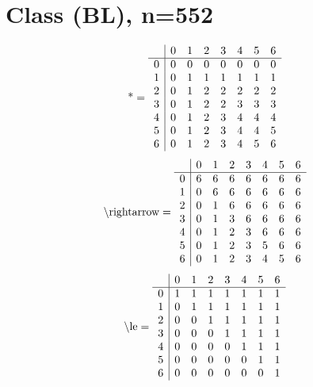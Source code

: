 \documentclass[11pt]{article}
\begin{document}
\section{Class (BL), n=552}
\[\text{*} = 
\begin{array}{r | r r r r r r r}
 & 0 & 1 & 2 & 3 & 4 & 5 & 6 \\ \hline
0 & 0 & 0 & 0 & 0 & 0 & 0 & 0 \\
1 & 0 & 1 & 1 & 1 & 1 & 1 & 1 \\
2 & 0 & 1 & 2 & 2 & 2 & 2 & 2 \\
3 & 0 & 1 & 2 & 2 & 3 & 3 & 3 \\
4 & 0 & 1 & 2 & 3 & 4 & 4 & 4 \\
5 & 0 & 1 & 2 & 3 & 4 & 4 & 5 \\
6 & 0 & 1 & 2 & 3 & 4 & 5 & 6 \\
\end{array}
\]
\[\text{\textbackslash rightarrow} = 
\begin{array}{r | r r r r r r r}
 & 0 & 1 & 2 & 3 & 4 & 5 & 6 \\ \hline
0 & 6 & 6 & 6 & 6 & 6 & 6 & 6 \\
1 & 0 & 6 & 6 & 6 & 6 & 6 & 6 \\
2 & 0 & 1 & 6 & 6 & 6 & 6 & 6 \\
3 & 0 & 1 & 3 & 6 & 6 & 6 & 6 \\
4 & 0 & 1 & 2 & 3 & 6 & 6 & 6 \\
5 & 0 & 1 & 2 & 3 & 5 & 6 & 6 \\
6 & 0 & 1 & 2 & 3 & 4 & 5 & 6 \\
\end{array}
\]
\[\text{\textbackslash le} = 
\begin{array}{r | r r r r r r r}
 & 0 & 1 & 2 & 3 & 4 & 5 & 6 \\ \hline
0 & 1 & 1 & 1 & 1 & 1 & 1 & 1 \\
1 & 0 & 1 & 1 & 1 & 1 & 1 & 1 \\
2 & 0 & 0 & 1 & 1 & 1 & 1 & 1 \\
3 & 0 & 0 & 0 & 1 & 1 & 1 & 1 \\
4 & 0 & 0 & 0 & 0 & 1 & 1 & 1 \\
5 & 0 & 0 & 0 & 0 & 0 & 1 & 1 \\
6 & 0 & 0 & 0 & 0 & 0 & 0 & 1 \\
\end{array}
\]
\end{document}
